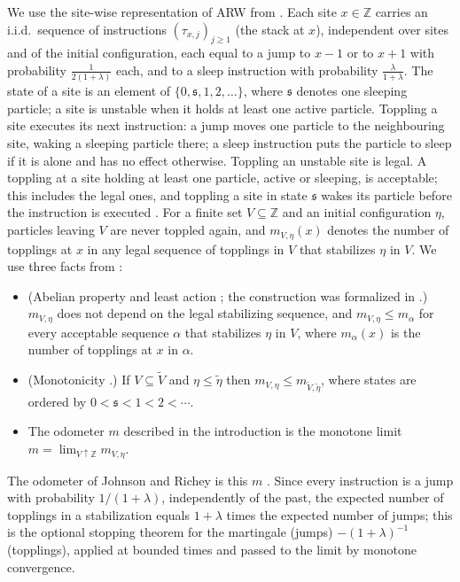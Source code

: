 \documentclass[11pt]{article}
\theoremstyle{remark}
\newcommand{\Z}{\mathbb Z}
\newcommand{\1}{\mathbf 1}
\begin{document}
We use the site-wise representation of ARW from \cite[Section~2]{Ro}. Each site $x\in\Z$ carries an i.i.d.\ sequence of instructions $(\tau_{x,j})_{j\ge1}$ (the stack at $x$), independent over sites and of the initial configuration, each equal to a jump to $x-1$ or to $x+1$ with probability $\tfrac{1}{2(1+\lambda)}$ each, and to a sleep instruction with probability $\tfrac{\lambda}{1+\lambda}$. The state of a site is an element of $\{0,\mathfrak s,1,2,\dots\}$, where $\mathfrak s$ denotes one sleeping particle; a site is unstable when it holds at least one active particle. Toppling a site executes its next instruction: a jump moves one particle to the neighbouring site, waking a sleeping particle there; a sleep instruction puts the particle to sleep if it is alone and has no effect otherwise. Toppling an unstable site is legal. A toppling at a site holding at least one particle, active or sleeping, is acceptable; this includes the legal ones, and toppling a site in state $\mathfrak s$ wakes its particle before the instruction is executed \cite[Section~2.2]{Ro}. For a finite set $V\subseteq\Z$ and an initial configuration $\eta$, particles leaving $V$ are never toppled again, and $m_{V,\eta}(x)$ denotes the number of topplings at $x$ in any legal sequence of topplings in $V$ that stabilizes $\eta$ in $V$. We use three facts from \cite{Ro}:
\begin{itemize}
\item[(A)] (Abelian property and least action \cite[Lemmas~2.1 and~2.4]{Ro}; the construction was formalized in \cite{RS}.) $m_{V,\eta}$ does not depend on the legal stabilizing sequence, and $m_{V,\eta}\le m_\alpha$ for every acceptable sequence $\alpha$ that stabilizes $\eta$ in $V$, where $m_\alpha(x)$ is the number of topplings at $x$ in $\alpha$.
\item[(B)] (Monotonicity \cite[Lemma~2.5]{Ro}.) If $V\subseteq\tilde V$ and $\eta\le\tilde\eta$ then $m_{V,\eta}\le m_{\tilde V,\tilde\eta}$, where states are ordered by $0<\mathfrak s<1<2<\cdots$.
\item[(C)] The odometer $m$ described in the introduction is the monotone limit $m=\lim_{V\uparrow\Z}m_{V,\eta}$.
\end{itemize}
The odometer of Johnson and Richey is this $m$ \cite[Sections~1--2]{JR}. Since every instruction is a jump with probability $1/(1+\lambda)$, independently of the past, the expected number of topplings in a stabilization equals $1+\lambda$ times the expected number of jumps; this is the optional stopping theorem for the martingale (jumps) $-(1+\lambda)^{-1}$(topplings), applied at bounded times and passed to the limit by monotone convergence.
\end{document}
